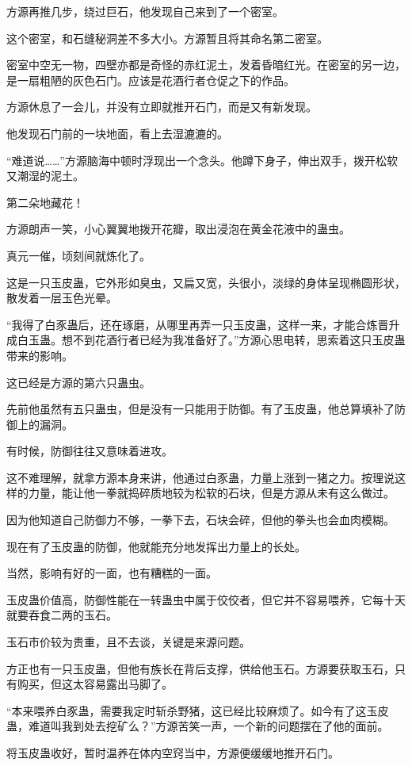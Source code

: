 \begin{this_body}
方源再推几步，绕过巨石，他发现自己来到了一个密室。

这个密室，和石缝秘洞差不多大小。方源暂且将其命名第二密室。

密室中空无一物，四壁亦都是奇怪的赤红泥土，发着昏暗红光。在密室的另一边，是一扇粗陋的灰色石门。应该是花酒行者仓促之下的作品。

方源休息了一会儿，并没有立即就推开石门，而是又有新发现。

他发现石门前的一块地面，看上去湿漉漉的。

“难道说……”方源脑海中顿时浮现出一个念头。他蹲下身子，伸出双手，拨开松软又潮湿的泥土。

第二朵地藏花！

方源朗声一笑，小心翼翼地拨开花瓣，取出浸泡在黄金花液中的蛊虫。

真元一催，顷刻间就炼化了。

这是一只玉皮蛊，它外形如臭虫，又扁又宽，头很小，淡绿的身体呈现椭圆形状，散发着一层玉色光晕。

“我得了白豕蛊后，还在琢磨，从哪里再弄一只玉皮蛊，这样一来，才能合炼晋升成白玉蛊。想不到花酒行者已经为我准备好了。”方源心思电转，思索着这只玉皮蛊带来的影响。

这已经是方源的第六只蛊虫。

先前他虽然有五只蛊虫，但是没有一只能用于防御。有了玉皮蛊，他总算填补了防御上的漏洞。

有时候，防御往往又意味着进攻。

这不难理解，就拿方源本身来讲，他通过白豕蛊，力量上涨到一猪之力。按理说这样的力量，能让他一拳就捣碎质地较为松软的石块，但是方源从未有这么做过。

因为他知道自己防御力不够，一拳下去，石块会碎，但他的拳头也会血肉模糊。

现在有了玉皮蛊的防御，他就能充分地发挥出力量上的长处。

当然，影响有好的一面，也有糟糕的一面。

玉皮蛊价值高，防御性能在一转蛊虫中属于佼佼者，但它并不容易喂养，它每十天就要吞食二两的玉石。

玉石市价较为贵重，且不去谈，关键是来源问题。

方正也有一只玉皮蛊，但他有族长在背后支撑，供给他玉石。方源要获取玉石，只有购买，但这太容易露出马脚了。

“本来喂养白豕蛊，需要我定时斩杀野猪，这已经比较麻烦了。如今有了这玉皮蛊，难道叫我到处去挖矿么？”方源苦笑一声，一个新的问题摆在了他的面前。

将玉皮蛊收好，暂时温养在体内空窍当中，方源便缓缓地推开石门。


\end{this_body}
